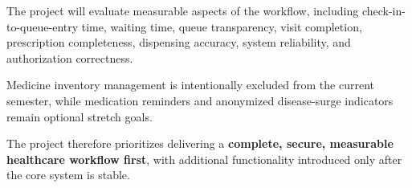\documentclass[11pt,a4paper]{article}
\begin{document}
The project will evaluate measurable aspects of the workflow, including check-in-to-queue-entry time, waiting time, queue transparency, visit completion, prescription completeness, dispensing accuracy, system reliability, and authorization correctness.

Medicine inventory management is intentionally excluded from the current semester, while medication reminders and anonymized disease-surge indicators remain optional stretch goals.

The project therefore prioritizes delivering a \textbf{complete, secure, measurable healthcare workflow first}, with additional functionality introduced only after the core system is stable.
\end{document}
